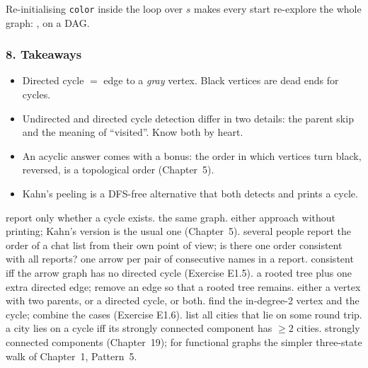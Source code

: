 \begin{warningbox}
Re-initialising \texttt{color} inside the loop over $s$ makes every start re-explore the whole graph: , \tle{} on a DAG.
\end{warningbox}

\subsubsection*{8. Takeaways}

\begin{itemize}[leftmargin=*]
    \item Directed cycle $=$ edge to a \emph{gray} vertex. Black vertices are dead ends for cycles.
    \item Undirected and directed cycle detection differ in two details: the parent skip and the meaning of ``visited''. Know both by heart.
    \item An acyclic answer comes with a bonus: the order in which vertices turn black, reversed, is a topological order (Chapter~5).
    \item Kahn's peeling is a DFS-free alternative that both detects and prints a cycle.
\end{itemize}

\begin{variantsbox}
  {report only whether a cycle exists.}
  {the same graph.}
  {either approach without printing; Kahn's version is the usual one (Chapter~5).}
  {several people report the order of a chat list from their own point of view; is there one order consistent with all reports?}
  {one arrow per pair of consecutive names in a report.}
  {consistent iff the arrow graph has no directed cycle (Exercise E1.5).}
  {a rooted tree plus one extra directed edge; remove an edge so that a rooted tree remains.}
  {either a vertex with two parents, or a directed cycle, or both.}
  {find the in-degree-2 vertex and the cycle; combine the cases (Exercise E1.6).}
  {list all cities that lie on some round trip.}
  {a city lies on a cycle iff its strongly connected component has $\ge 2$ cities.}
  {strongly connected components (Chapter~19); for functional graphs the simpler three-state walk of Chapter~1, Pattern~5.}
\end{variantsbox}

